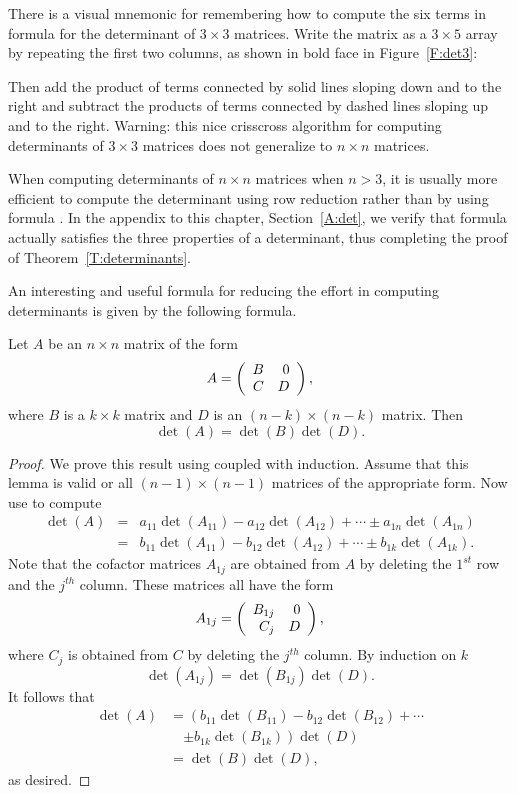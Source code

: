 \documentclass{ximera}
\begin{document}
There is a visual mnemonic for remembering how to compute the six
terms in formula  for the determinant of 
$3\times 3$ matrices.
Write the matrix as a $3\times 5$ array by repeating the first 
two columns, as shown in bold face in Figure~\ref{F:det3}:
\begin{figure*}[htb]
           \centerline{%
            }
           \caption{Mnemonic for computation of determinants of 
		$3\times 3$ matrices.}
           \label{F:det3}
\end{figure*}
Then add the product of terms connected by solid lines sloping down and 
to the right and subtract the products of terms connected by dashed lines 
sloping up and to the right.  Warning: this nice crisscross algorithm 
for computing determinants of $3\times 3$ matrices does not generalize 
to $n\times n$ matrices.
 
When computing determinants of $n\times n$ matrices when $n>3$,
it is usually more efficient to compute the determinant using row
reduction rather than by using formula .  In the
appendix to this chapter, Section~\ref{A:det}, we verify that formula 
 actually satisfies the three properties of a determinant, 
thus completing the proof of Theorem~\ref{T:determinants}.  

An interesting and useful formula for reducing the effort in 
computing determinants is given by the following formula.
\begin{lemma} \label{L:detblockdiag}
Let $A$ be an $n\times n$ matrix of the form
\[
A=\left(\begin{array}{rr} B & 0\\ C &D\end{array}\right),
\]
where $B$ is a $k\times k$ matrix and $D$ is an $(n-k)\times(n-k)$
matrix.  Then
\[
\det(A)=\det(B)\det(D).
\]
\end{lemma}

\begin{proof} We prove this result using  coupled with 
induction. Assume that this lemma is valid or all $(n-1)\times
(n-1)$ matrices of the appropriate form.  Now use
 to compute
\begin{eqnarray*}
\det(A) & = & a_{11}\det(A_{11})-a_{12}\det(A_{12}) + \cdots\pm
a_{1n}\det(A_{1n}) \\
& = &  b_{11}\det(A_{11})-b_{12}\det(A_{12}) + \cdots\pm
b_{1k}\det(A_{1k}).
\end{eqnarray*}
Note that the cofactor matrices $A_{1j}$ are obtained from $A$
by deleting the $1^{st}$ row and the $j^{th}$ column.  These
matrices all have the form
\[
A_{1j} = \left(\begin{array}{rr} B_{1j} & 0\\ C_j &D\end{array}\right),
\]
where $C_j$ is obtained from $C$ by deleting the $j^{th}$
column. By induction on $k$
\[
\det(A_{1j}) = \det(B_{1j})\det(D).
\]
It follows that 
\begin{align*}
  \det(A) & = \left(b_{11}\det(B_{11})-b_{12}\det(B_{12}) + \cdots \right. \\
  &\quad \left. \pm
b_{1k}\det(B_{1k})\right)\det(D) \\
& = \det(B)\det(D),
\end{align*}
as desired.  \end{proof}
\end{document}
